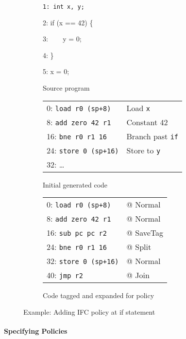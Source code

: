 \documentclass{report}
\begin{document}
\begin{figure}
  \begin{subfigure}[t]{0.22\textwidth}
    \vspace{0em}
    {\tt 1: int x, y;

    2: if (x == 42) \{

    3: ~~~ y = 0;

    4: \}

    5: x = 0;
    }

    \caption{Source program}
    \label{ex:if0}
  \end{subfigure}
  \begin{subfigure}[t]{0.42\textwidth}
    \vspace{0em}
    \begin{tabular}{l l}
      0: {\tt load r0 (sp+8)} & Load {\tt x} \\
      8: {\tt add zero 42 r1} & Constant 42 \\
      16: {\tt bne r0 r1 16} & Branch past {\tt if} \\
      24: {\tt store 0 (sp+16)} & Store to {\tt y} \\
      32: \dots & \\
    \end{tabular}
    \caption{Initial generated code}
    \label{ex:if1}
  \end{subfigure}
  \begin{subfigure}[t]{0.4\textwidth}
     \vspace{0em}
     \begin{tabular}{l l}
      0: {\tt load r0 (sp+8)} & @ {\sc Normal} \\
      8: {\tt add zero 42 r1} & @ {\sc Normal} \\
      16: {\tt sub pc pc r2} & @ {\sc SaveTag} \\
      24: {\tt bne r0 r1 16} & @ {\sc Split} \\
      32: {\tt store 0 (sp+16)} & @ {\sc Normal} \\
      40: {\tt jmp r2} & @ {\sc Join} \\
    \end{tabular}
    \caption{Code tagged and expanded for policy}
    \label{ex:if2}
  \end{subfigure}

  \caption{Example: Adding IFC policy at if statement}
  \label{ex:if}
\end{figure}

\paragraph{Specifying Policies}
\end{document}
